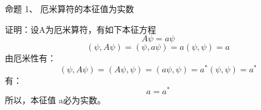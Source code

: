 \begin{frame} [allowframebreaks=]
    \frametitle{}
    \begin{tcolorbox1}{命题 1、}
    厄米算符的本征值为实数
    \end{tcolorbox1}
    \alert{证明：}设A为厄米算符，有如下本征方程
    $$A\psi=a\psi $$
    \begin{equation*}
        (\psi, A\psi)=(\psi, a\psi)=a(\psi, \psi)=a
    \end{equation*}  
    由厄米性有：
    \begin{equation*}
        (\psi, A\psi)=(A\psi, \psi)=(a\psi, \psi)= a^* (\psi, \psi)=a^*
    \end{equation*}
    有：
    \begin{equation*}
        a= a^* 
    \end{equation*}
    所以，本征值 a必为实数。
\end{frame} 

